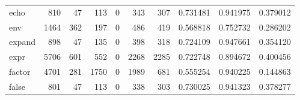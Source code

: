\begin{longtable}{lrrrrrrrrr}
echo      &                                 810 &                                              47 &                                            113 &                                             0 &                                            343 &                                          307 &                                           0.731481 &                               0.941975 &                             0.379012 \\
env       &                                1464 &                                             362 &                                            197 &                                             0 &                                            486 &                                          419 &                                           0.568818 &                               0.752732 &                             0.286202 \\
expand    &                                 898 &                                              47 &                                            135 &                                             0 &                                            398 &                                          318 &                                           0.724109 &                               0.947661 &                             0.354120 \\
expr      &                                5706 &                                             601 &                                            552 &                                             0 &                                           2268 &                                         2285 &                                           0.722748 &                               0.894672 &                             0.400456 \\
factor    &                                4701 &                                             281 &                                           1750 &                                             0 &                                           1989 &                                          681 &                                           0.555254 &                               0.940225 &                             0.144863 \\
false     &                                 801 &                                              47 &                                            113 &                                             0 &                                            338 &                                          303 &                                           0.730025 &                               0.941323 &                             0.378277 \\

\end{longtable}
